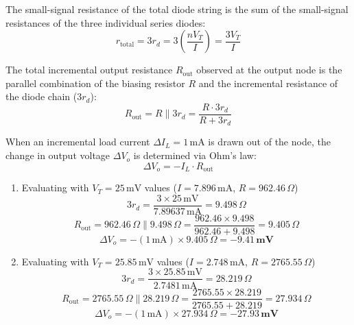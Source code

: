 \documentclass[12pt,a3paper]{article}
\begin{document}
\begin{enumerate}
\begin{tcolorbox}[enhanced,breakable,ansbox,colback=cA!4,colframe=cA,boxrule=0.8pt,arc=5pt,title={\textbf{Answer}},fonttitle=\bfseries\color{white},colbacktitle=cA]
The small-signal resistance of the total diode string is the sum of the small-signal resistances of the three individual series diodes:
\begin{equation}
r_{\text{total}} = 3 r_d = 3 \left( \frac{n V_T}{I} \right) = \frac{3 V_T}{I}
\end{equation}

The total incremental output resistance $R_{\text{out}}$ observed at the output node is the parallel combination of the biasing resistor $R$ and the incremental resistance of the diode chain ($3r_d$):
\begin{equation}
R_{\text{out}} = R \parallel 3r_d = \frac{R \cdot 3r_d}{R + 3r_d}
\end{equation}

When an incremental load current $\Delta I_L = 1\,\text{mA}$ is drawn out of the node, the change in output voltage $\Delta V_o$ is determined via Ohm's law:
\begin{equation}
\Delta V_o = -I_L \cdot R_{\text{out}}
\end{equation}

\begin{enumerate}[leftmargin=*]
    \item[\textbf{Case A:}] Evaluating with $V_T = 25\,\text{mV}$ values ($I = 7.896\,\text{mA}$, $R = 962.46\,\Omega$)
    \begin{equation}
    3r_d = \frac{3 \times 25\,\text{mV}}{7.89637\,\text{mA}} = 9.498\,\Omega
    \end{equation}
    \begin{equation}
    R_{\text{out}} = 962.46\,\Omega \parallel 9.498\,\Omega = \frac{962.46 \times 9.498}{962.46 + 9.498} = 9.405\,\Omega
    \end{equation}
    \begin{equation}
    \Delta V_o = -(1\,\text{mA}) \times 9.405\,\Omega = \mathbf{-9.41\,\text{mV}}
    \end{equation}

    \item[\textbf{Case B:}] Evaluating with $V_T = 25.85\,\text{mV}$ values ($I = 2.748\,\text{mA}$, $R = 2765.55\,\Omega$)
    \begin{equation}
    3r_d = \frac{3 \times 25.85\,\text{mV}}{2.7481\,\text{mA}} = 28.219\,\Omega
    \end{equation}
    \begin{equation}
    R_{\text{out}} = 2765.55\,\Omega \parallel 28.219\,\Omega = \frac{2765.55 \times 28.219}{2765.55 + 28.219} = 27.934\,\Omega
    \end{equation}
    \begin{equation}
    \Delta V_o = -(1\,\text{mA}) \times 27.934\,\Omega = \mathbf{-27.93\,\text{mV}}
    \end{equation}
\end{enumerate}


\end{tcolorbox}
\end{enumerate}
\end{document}
